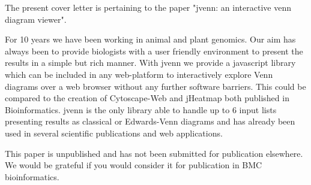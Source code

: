 \documentclass[10pt,stdletter,dateno,sigleft]{newlfm} %
\begin{document}
\begin{newlfm}


The present cover letter is pertaining to the paper "jvenn: an interactive venn diagram viewer".

For 10 years we have been working in animal and plant genomics. Our aim has always been to provide biologists with a user friendly environment 
to present the results in a simple but rich manner. With jvenn we provide a javascript library which can be included in any web-platform to 
interactively explore Venn diagrams over a web browser without any further software barriers. This could be compared to the creation of Cytoscape-Web 
and jHeatmap both published in Bioinformatics. jvenn is the only library able to handle up to 6 input lists presenting results as classical or 
Edwards-Venn diagrams and has already been used in several scientific publications and web applications. 

This paper is unpublished and has not been submitted for publication elsewhere.
We would be grateful if you would consider it for publication in BMC bioinformatics.


\end{newlfm}
\end{document}
